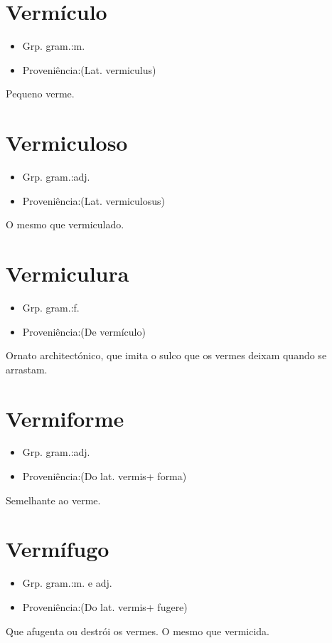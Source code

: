 \documentclass{article}
\begin{document}
\section{Vermículo}
\begin{itemize}
\item {Grp. gram.:m.}
\end{itemize}
\begin{itemize}
\item {Proveniência:(Lat. \textunderscore vermiculus\textunderscore )}
\end{itemize}
Pequeno verme.
\section{Vermiculoso}
\begin{itemize}
\item {Grp. gram.:adj.}
\end{itemize}
\begin{itemize}
\item {Proveniência:(Lat. \textunderscore vermiculosus\textunderscore )}
\end{itemize}
O mesmo que \textunderscore vermiculado\textunderscore .
\section{Vermiculura}
\begin{itemize}
\item {Grp. gram.:f.}
\end{itemize}
\begin{itemize}
\item {Proveniência:(De \textunderscore vermículo\textunderscore )}
\end{itemize}
Ornato architectónico, que imita o sulco que os vermes deixam quando se arrastam.
\section{Vermiforme}
\begin{itemize}
\item {Grp. gram.:adj.}
\end{itemize}
\begin{itemize}
\item {Proveniência:(Do lat. \textunderscore vermis\textunderscore  + \textunderscore forma\textunderscore )}
\end{itemize}
Semelhante ao verme.
\section{Vermífugo}
\begin{itemize}
\item {Grp. gram.:m.  e  adj.}
\end{itemize}
\begin{itemize}
\item {Proveniência:(Do lat. \textunderscore vermis\textunderscore  + \textunderscore fugere\textunderscore )}
\end{itemize}
Que afugenta ou destrói os vermes.
O mesmo que \textunderscore vermicida\textunderscore .
\end{document}
